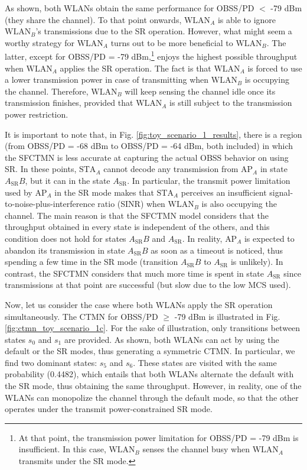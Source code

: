 \documentclass[preprint,12pt]{elsarticle}
\begin{document}
	As shown, both WLANs obtain the same performance for OBSS/PD $<$ -79 dBm (they share the channel). To that point onwards, $\text{WLAN}_A$ is able to ignore $\text{WLAN}_B$'s transmissions due to the SR operation. However, what might seem a worthy strategy for $\text{WLAN}_A$ turns out to be more beneficial to $\text{WLAN}_B$. The latter, except for OBSS/PD = -79 dBm,\footnote{At that point, the transmission power limitation for OBSS/PD = -79 dBm is insufficient. In this case, $\text{WLAN}_B$ senses the channel busy when $\text{WLAN}_A$ transmits under the SR mode.} enjoys the highest possible throughput when $\text{WLAN}_A$ applies the SR operation. The fact is that $\text{WLAN}_A$ is forced to use a lower transmission power in case of transmitting when $\text{WLAN}_B$ is occupying the channel. Therefore, $\text{WLAN}_B$ will keep sensing the channel idle once its transmission finishes, provided that $\text{WLAN}_A$ is still subject to the transmission power restriction.
	
	It is important to note that, in Fig. \ref{fig:toy_scenario_1_results}, there is a region (from OBSS/PD = -68 dBm to OBSS/PD = -64 dBm, both included) in which the SFCTMN is less accurate at capturing the actual OBSS behavior on using SR. In these points, $\text{STA}_A$ cannot decode any transmission from $\text{AP}_A$ in state $A_\text{SR}B$, but it can in the state $A_\text{SR}$. In particular, the transmit power limitation used by $\text{AP}_A$ in the SR mode makes that $\text{STA}_A$ perceives an insufficient signal-to-noise-plus-interference ratio (SINR) when $\text{WLAN}_B$ is also occupying the channel. The main reason is that the SFCTMN model considers that the throughput obtained in every state is independent of the others, and this condition does not hold for states $A_\text{SR}B$ and $A_\text{SR}$. In reality, $\text{AP}_A$ is expected to abandon its transmission in state $A_\text{SR}B$ as soon as a timeout is noticed, thus spending a few time in the SR mode (transition $A_\text{SR}B$ to $A_\text{SR}$ is unlikely). In contrast, the SFCTMN considers that much more time is spent in state $A_\text{SR}$ since transmissions at that point are successful (but slow due to the low MCS used).
		
	Now, let us consider the case where both WLANs apply the SR operation simultaneously. The CTMN for OBSS/PD $\geq$ -79 dBm is illustrated in Fig. \ref{fig:ctmn_toy_scenario_1c}. For the sake of illustration, only transitions between states $s_0$ and $s_1$ are provided. As shown, both WLANs can act by using the default or the SR modes, thus generating a symmetric CTMN. In particular, we find two dominant states: $s_5$  and $s_6$. These states are visited with the same probability (0.4482), which entails that both WLANs alternate the default with the SR mode, thus obtaining the same throughput. However, in reality, one of the WLANs can monopolize the channel through the default mode, so that the other operates under the transmit power-constrained SR mode.
	
\end{document}
